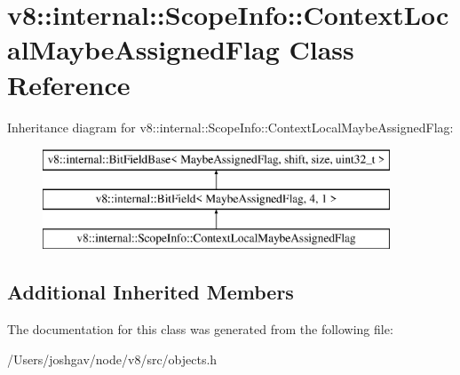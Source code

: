 \hypertarget{classv8_1_1internal_1_1_scope_info_1_1_context_local_maybe_assigned_flag}{}\section{v8\+:\+:internal\+:\+:Scope\+Info\+:\+:Context\+Local\+Maybe\+Assigned\+Flag Class Reference}
\label{classv8_1_1internal_1_1_scope_info_1_1_context_local_maybe_assigned_flag}
Inheritance diagram for v8\+:\+:internal\+:\+:Scope\+Info\+:\+:Context\+Local\+Maybe\+Assigned\+Flag\+:\begin{figure}[H]
\begin{center}
\leavevmode
\includegraphics[height=3.000000cm]{classv8_1_1internal_1_1_scope_info_1_1_context_local_maybe_assigned_flag}
\end{center}
\end{figure}
\subsection*{Additional Inherited Members}


The documentation for this class was generated from the following file\+:\begin{DoxyCompactItemize}
\item 
/\+Users/joshgav/node/v8/src/objects.\+h\end{DoxyCompactItemize}
